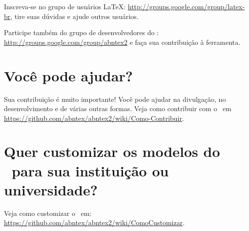     Inscreva-se no grupo de usuários \LaTeX:
    \url{http://groups.google.com/group/latex-br}, tire suas dúvidas e ajude
    outros usuários.

    Participe também do grupo de desenvolvedores do \abnTeX:
    \url{http://groups.google.com/group/abntex2} e faça sua contribuição à
    ferramenta.

    \section{Você pode ajudar?}

    Sua contribuição é muito importante! Você pode ajudar na divulgação, no
    desenvolvimento e de várias outras formas. Veja como contribuir com o \abnTeX\
    em \url{https://github.com/abntex/abntex2/wiki/Como-Contribuir}.

    \section{Quer customizar os modelos do \abnTeX\ para sua instituição ou
    universidade?}

    Veja como customizar o \abnTeX\ em:
    \url{https://github.com/abntex/abntex2/wiki/ComoCustomizar}.
